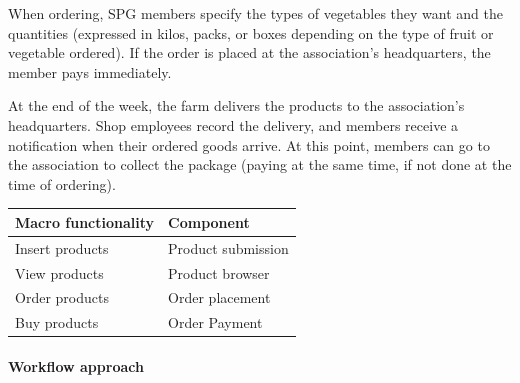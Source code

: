 \begin{flushleft}
  \begin{minipage}{0.55\linewidth}


    When ordering, SPG members specify the types of vegetables they
    want and the quantities (expressed in kilos, packs, or boxes
    depending on the type of fruit or vegetable ordered). If the order is
    placed at the association's headquarters, the member pays
    immediately.\newline

    At the end of the week, the farm delivers the products to the
    association's headquarters. Shop employees record the delivery, and
    members receive a notification when their ordered goods arrive. At
    this point, members can go to the association to collect the package
    (paying at the same time, if not done at the time of ordering).
  \end{minipage}%
  \hfill%
  \begin{minipage}{0.40\linewidth}
    \vspace{0pt}
    \centering
    \renewcommand{\arraystretch}{1.4}
    \begin{tabular}{ll}
      \textbf{Macro functionality} & \textbf{Component} \\

      \hline
      Insert products              & Product submission \\
      View products                & Product browser    \\
      Order products               & Order placement    \\
      Buy products                 & Order Payment      \\
    \end{tabular}
  \end{minipage}
\end{flushleft}




\paragraph{Workflow approach}

